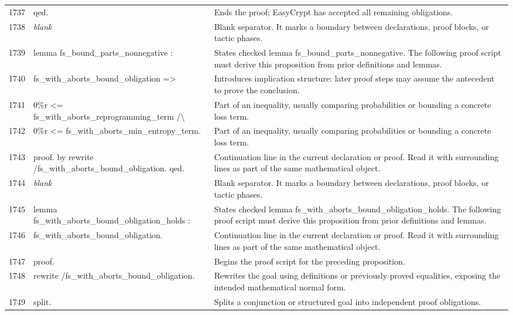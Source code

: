 \documentclass[10pt]{article}
\begin{document}
\begin{longtable}{r L{0.53\textwidth} L{0.37\textwidth}}
1737 & {\ttfamily\scriptsize qed.} & Ends the proof; EasyCrypt has accepted all remaining obligations. \\
1738 & {\ttfamily\scriptsize \emph{blank}} & Blank separator.  It marks a boundary between declarations, proof blocks, or tactic phases. \\
1739 & {\ttfamily\scriptsize lemma fs\_bound\_parts\_nonnegative :} & States checked lemma fs\_bound\_parts\_nonnegative.  The following proof script must derive this proposition from prior definitions and lemmas. \\
1740 & {\ttfamily\scriptsize   fs\_with\_aborts\_bound\_obligation =>} & Introduces implication structure: later proof steps may assume the antecedent to prove the conclusion. \\
1741 & {\ttfamily\scriptsize   0\%r <= fs\_with\_aborts\_reprogramming\_term /\textbackslash{}} & Part of an inequality, usually comparing probabilities or bounding a concrete loss term. \\
1742 & {\ttfamily\scriptsize   0\%r <= fs\_with\_aborts\_min\_entropy\_term.} & Part of an inequality, usually comparing probabilities or bounding a concrete loss term. \\
1743 & {\ttfamily\scriptsize proof. by rewrite /fs\_with\_aborts\_bound\_obligation. qed.} & Continuation line in the current declaration or proof.  Read it with surrounding lines as part of the same mathematical object. \\
1744 & {\ttfamily\scriptsize \emph{blank}} & Blank separator.  It marks a boundary between declarations, proof blocks, or tactic phases. \\
1745 & {\ttfamily\scriptsize lemma fs\_with\_aborts\_bound\_obligation\_holds :} & States checked lemma fs\_with\_aborts\_bound\_obligation\_holds.  The following proof script must derive this proposition from prior definitions and lemmas. \\
1746 & {\ttfamily\scriptsize   fs\_with\_aborts\_bound\_obligation.} & Continuation line in the current declaration or proof.  Read it with surrounding lines as part of the same mathematical object. \\
1747 & {\ttfamily\scriptsize proof.} & Begins the proof script for the preceding proposition. \\
1748 & {\ttfamily\scriptsize rewrite /fs\_with\_aborts\_bound\_obligation.} & Rewrites the goal using definitions or previously proved equalities, exposing the intended mathematical normal form. \\
1749 & {\ttfamily\scriptsize split.} & Splits a conjunction or structured goal into independent proof obligations. \\

\end{longtable}
\end{document}
